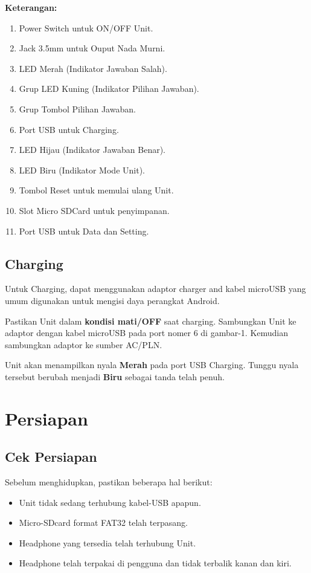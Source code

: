 \documentclass[12pt,]{article}
\begin{document}
	\newpage
	\textbf{Keterangan:}
	\begin{enumerate}
		\item Power Switch untuk ON/OFF Unit.
		\item Jack 3.5mm untuk Ouput Nada Murni.
		\item LED Merah (Indikator Jawaban Salah).
		\item Grup LED Kuning (Indikator Pilihan Jawaban).
		\item Grup Tombol Pilihan Jawaban.
		\item Port USB untuk Charging.
		\item LED Hijau (Indikator Jawaban Benar).
		\item LED Biru (Indikator Mode Unit).
		\item Tombol Reset untuk memulai ulang Unit.
		\item Slot Micro SDCard untuk penyimpanan.
		\item Port USB untuk Data dan Setting.
	\end{enumerate}
	
	\subsection{Charging}
	
	Untuk Charging, dapat menggunakan adaptor charger and kabel microUSB yang umum digunakan untuk mengisi daya perangkat Android.
	
	Pastikan Unit dalam \textbf{kondisi mati/OFF} saat charging. 
	Sambungkan Unit ke adaptor dengan kabel microUSB pada port nomer 6 di gambar-1. Kemudian sambungkan adaptor ke sumber AC/PLN.
	
	Unit akan menampilkan nyala \textbf{Merah} pada port USB Charging.
	Tunggu nyala tersebut berubah menjadi \textbf{Biru} sebagai tanda telah penuh.
	
	\newpage
	\section{Persiapan}
	
	\subsection{Cek Persiapan}
	
	Sebelum menghidupkan, pastikan beberapa hal berikut:
	
	\begin{itemize}
		\item Unit tidak sedang terhubung kabel-USB apapun.
		\item Micro-SDcard format FAT32 telah terpasang.
		\item Headphone yang tersedia telah terhubung Unit.
		\item Headphone telah terpakai di pengguna dan tidak terbalik
		kanan dan kiri.
	\end{itemize}
\end{document}
